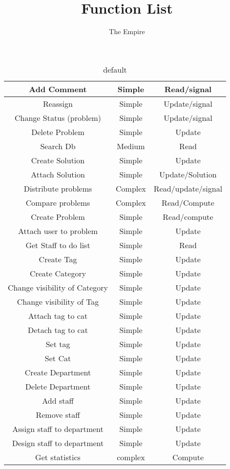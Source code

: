 \documentclass[11pt]{amsart}
\title{Function List}
\author{The Empire}
\begin{document}
\maketitle

\begin{table}[htdp]
\caption{default}
\begin{center}
\begin{tabular}{|c|c|c|}
\hline
Add Comment &   Simple & Read/signal   \\ \hline%
Reassign & Simple   & Update/signal \\ \hline%
Change Status (problem) &   Simple & Update/signal \\ \hline%
Delete Problem & Simple &   Update \\   \hline%
Search Db & Medium &   Read \\ \hline%
Create Solution & Simple &   Update \\   \hline%
Attach Solution & Simple &   Update/Solution \\   \hline%
Distribute problems &   Complex & Read/update/signal \\   \hline%
Compare problems & Complex & Read/Compute \\ \hline%
Create Problem &   Simple & Read/compute \\   \hline%
Attach user to problem & Simple & Update \\ \hline%
Get Staff to do list & Simple & Read \\   \hline%
Create Tag & Simple &   Update \\ \hline%
Create Category & Simple & Update \\ \hline%
Change visibility of Category &   Simple &   Update \\   \hline%
Change visibility of Tag &   Simple &  Update \\ \hline%
Attach tag to cat & Simple & Update \\ \hline%
Detach tag to cat & Simple & Update \\ \hline%
Set tag & Simple & Update \\ \hline%
Set Cat & Simple & Update \\ \hline%
Create Department & Simple & Update \\ \hline%
Delete Department & Simple & Update \\ \hline%
Add staff & Simple & Update \\ \hline%
Remove staff & Simple & Update \\ \hline%
Assign staff to department & Simple & Update \\ \hline%
Design staff to department & Simple & Update \\ \hline%
Get statistics & complex & Compute \\ \hline%

\end{tabular}
\end{center}
\label{default}
\end{table}%
\end{document}

